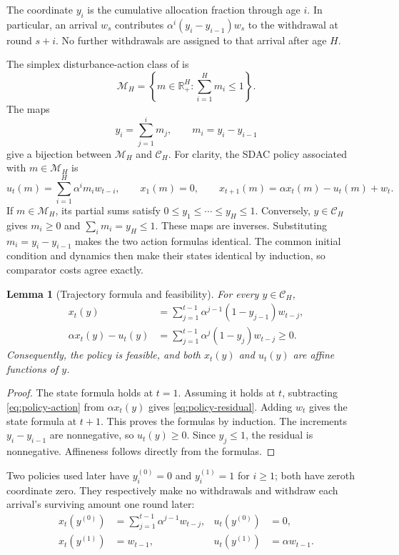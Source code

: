 \documentclass[11pt]{article}
\newtheorem{lemma}[theorem]{Lemma}
\newcommand{\R}{\mathbb R}
\newcommand{\CH}{\mathcal C_H}
\begin{document}
The coordinate $y_i$ is the cumulative allocation fraction through
age $i$. In particular, an arrival $w_s$ contributes
$\alpha^i(y_i-y_{i-1})w_s$ to the withdrawal at round $s+i$.
No further withdrawals are assigned to that arrival after age $H$.

The simplex disturbance-action class of
\cite{asgari2026sdac} is
\[
\mathcal M_H
=
\left\{m\in\R_+^H:\sum_{i=1}^H m_i\le1\right\}.
\]
The maps
\begin{equation}
\label{eq:bijection}
y_i=\sum_{j=1}^i m_j,
\qquad
m_i=y_i-y_{i-1}
\end{equation}
give a bijection between $\mathcal M_H$ and $\CH$.
For clarity, the SDAC policy associated with $m\in\mathcal M_H$ is
\[
u_t(m)=\sum_{i=1}^H\alpha^i m_iw_{t-i},
\qquad
x_1(m)=0,\qquad
x_{t+1}(m)=\alpha x_t(m)-u_t(m)+w_t.
\]
If $m\in\mathcal M_H$, its partial sums satisfy
$0\le y_1\le\cdots\le y_H\le1$. Conversely, $y\in\CH$ gives
$m_i\ge0$ and $\sum_i m_i=y_H\le1$. These maps are inverses.
Substituting $m_i=y_i-y_{i-1}$ makes the two action formulas
identical. The common initial condition and dynamics then make
their states identical by induction, so comparator costs agree exactly.

\begin{lemma}[Trajectory formula and feasibility]
\label{lem:trajectory}
For every $y\in\CH$,
\begin{align}
\label{eq:policy-state}
x_t(y)
&=\sum_{j=1}^{t-1}\alpha^{j-1}(1-y_{j-1})w_{t-j},\\
\label{eq:policy-residual}
\alpha x_t(y)-u_t(y)
&=\sum_{j=1}^{t-1}\alpha^j(1-y_j)w_{t-j}\ge0.
\end{align}
Consequently, the policy is feasible, and both $x_t(y)$ and
$u_t(y)$ are affine functions of $y$.
\end{lemma}

\begin{proof}
The state formula holds at $t=1$. Assuming it holds at $t$,
subtracting \eqref{eq:policy-action} from $\alpha x_t(y)$ gives
\eqref{eq:policy-residual}. Adding $w_t$ gives the state formula
at $t+1$. This proves the formulas by induction.
The increments $y_i-y_{i-1}$ are nonnegative, so $u_t(y)\ge0$.
Since $y_j\le1$, the residual is nonnegative.
Affineness follows directly from the formulas.
\end{proof}

Two policies used later have $y_i^{(0)}=0$ and $y_i^{(1)}=1$
for $i\ge1$; both have zeroth coordinate zero. They respectively
make no withdrawals and
withdraw each arrival's surviving amount one round later:
\begin{equation}
\label{eq:endpoints}
\begin{aligned}
x_t(y^{(0)})
&=\sum_{j=1}^{t-1}\alpha^{j-1}w_{t-j},
&
u_t(y^{(0)})&=0,\\
x_t(y^{(1)})&=w_{t-1},
&
u_t(y^{(1)})&=\alpha w_{t-1}.
\end{aligned}
\end{equation}
\end{document}
